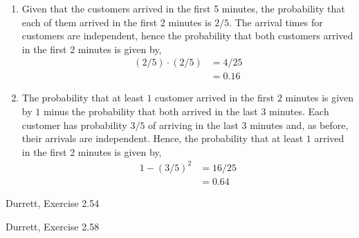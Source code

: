 \documentclass[12pt]{article}
\newenvironment{problem}[2][Problem]{\begin{trivlist}
\item[\hskip \labelsep {\bfseries #1}\hskip \labelsep {\bfseries #2.}]}{\end{trivlist}}
\begin{document}
\begin{enumerate}[label=\alph*]

\item Given that the customers arrived in the first 5 minutes, the probability that each of them arrived in the first 2 minutes is $2/5$. The arrival times for customers are independent, hence the probability that both customers arrived in the first 2 minutes is given by,
\begin{align*}
(2/5) \cdot (2/5) &= 4/25\\
&= 0.16
\end{align*}

\item The probability that at least $1$ customer arrived in the first $2$ minutes is given by $1$ minus the probability that both arrived in the last $3$ minutes. Each customer has probability $3/5$ of arriving in the last $3$ minutes and, as before, their arrivals are independent. Hence, the probability that at least $1$ arrived in the first $2$ minutes is given by,
\begin{align*}
1 - (3/5)^2 &= 16/25\\
&= 0.64
\end{align*}

\end{enumerate}

\begin{problem}{3}
Durrett, Exercise 2.54
\end{problem}

\begin{problem}{4}
Durrett, Exercise 2.58
\end{problem}
\end{document}
